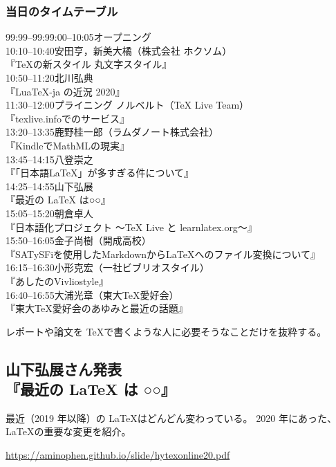 \documentclass[aspectratio=149]{beamer}
\begin{document}
\begin{frame}
	\frametitle{当日のタイムテーブル}
	\begingroup\tiny
	\begin{tabbing}
		99:99--99:99\quad\=:00--10:05\>オープニング\\
		10:10--10:40\>安田亨，新美大橘（株式会社 ホクソム）\\
		\>『TeXの新スタイル 丸文字スタイル』\\
		10:50--11:20\>北川弘典\\
		\>『LuaTeX-ja の近況 2020』\\
		11:30--12:00\>プライニング ノルベルト（TeX Live Team）\\
		\>『texlive.infoでのサービス』\\
		13:20--13:35\>鹿野桂一郎（ラムダノート株式会社）\\
		\>『KindleでMathMLの現実』\\
		13:45--14:15\>八登崇之\\
		\>『「日本語LaTeX」が多すぎる件について』\\
		14:25--14:55\>山下弘展\\
		\>『最近の LaTeX は○○』\\
		15:05--15:20\>朝倉卓人\\
		\>『日本語化プロジェクト 〜TeX Live と learnlatex​.org〜』\\
		15:50--16:05\>金子尚樹（開成高校）\\
		\>『SATySFiを使用したMarkdownからLaTeXへのファイル変換について』\\
		16:15--16:30\>小形克宏（一社ビブリオスタイル）\\
		\>『あしたのVivliostyle』\\
		16:40--16:55\>大浦光章（東大TeX愛好会）\\
		\>『東大TeX愛好会のあゆみと最近の話題』
	\end{tabbing}
	\endgroup
	レポートや論文を \TeX で書くような人に必要そうなことだけを抜粋する。
\end{frame}

\begin{frame}
	\section{山下弘展さん発表\\『最近の LaTeX は ○○』}
	
	最近（2019 年以降）の \LaTeX はどんどん変わっている。
	2020 年にあった、\LaTeX の重要な変更を紹介。
	
	\url{https://aminophen.github.io/slide/hytexonline20.pdf}
\end{frame}
\end{document}
